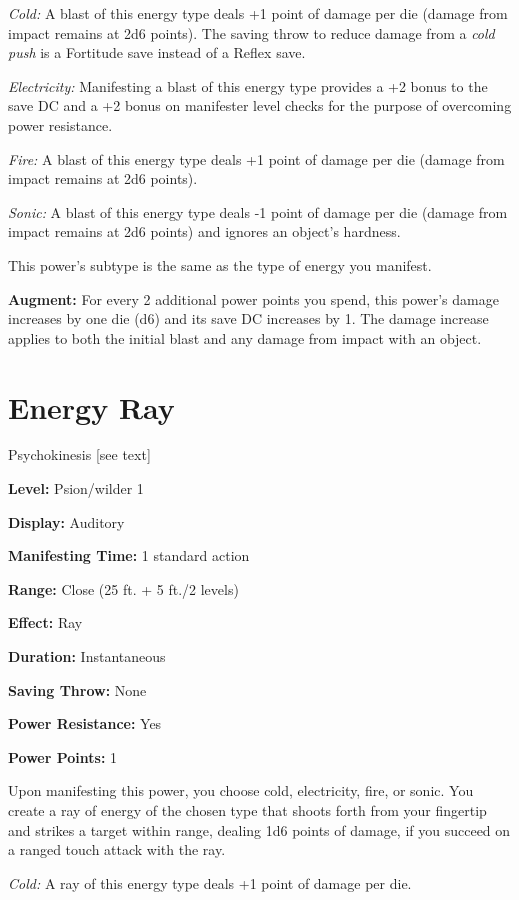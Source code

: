 \documentclass{article}
\begin{document}
\textit{Cold: }A blast of this energy type deals +1 point of damage per die (damage 
from impact remains at 2d6 points). The saving throw to reduce damage from a \textit{cold 
push }is a Fortitude save instead of a Reflex save.

\textit{Electricity: }Manifesting a blast of this energy type provides a +2 bonus 
to the save DC and a +2 bonus on manifester level checks for the purpose of overcoming 
power resistance.

\textit{Fire: }A blast of this energy type deals +1 point of damage per die (damage 
from impact remains at 2d6 points).

\textit{Sonic: }A blast of this energy type deals -1 point of damage per die (damage 
from impact remains at 2d6 points) and ignores an object's hardness.

This power's subtype is the same as the type of energy you manifest.

\textbf{Augment:} For every 2 additional power points you spend, this power's damage 
increases by one die (d6) and its save DC increases by 1. The damage increase applies 
to both the initial blast and any damage from impact with an object.

\vspace{12pt}
\section*{Energy Ray}

Psychokinesis [see text]

\textbf{Level:} Psion/wilder 1

\textbf{Display:} Auditory

\textbf{Manifesting Time:} 1 standard action

\textbf{Range:} Close (25 ft. + 5 ft./2 levels)

\textbf{Effect:} Ray

\textbf{Duration:} Instantaneous

\textbf{Saving Throw:} None

\textbf{Power Resistance:} Yes

\textbf{Power Points:} 1

Upon manifesting this power, you choose cold, electricity, fire, or sonic. You 
create a ray of energy of the chosen type that shoots forth from your fingertip 
and strikes a target within range, dealing 1d6 points of damage, if you succeed 
on a ranged touch attack with the ray.

\textit{Cold: }A ray of this energy type deals +1 point of damage per die.
\end{document}
